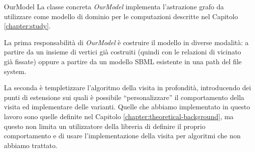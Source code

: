 \begin{paragraph}{OurModel}
  La classe concreta \emph{OurModel} implementa l'astrazione grafo da
  utilizzare come modello di dominio per le computazioni descritte nel
  Capitolo \ref{chapter:study}.

  La prima responsabilit\`a di \emph{OurModel} \`e costruire il
  modello in diverse modalit\`a: a partire da un insieme di vertici
  gi\`a costruiti (quindi con le relazioni di vicinato gi\`a fissate)
  oppure a partire da un modello SBML esistente in una path del file
  system.

  La seconda \`e templetizzare l'algoritmo della visita in
  profondit\`a, introducendo dei punti di estensione sui quali \`e
  possibile ``personalizzare'' il comportamento della visita ed
  implementare delle varianti. Quelle che abbiamo implementato in
  questo lavoro sono quelle definite nel Capitolo
  \ref{chapter:theoretical-background}, ma questo non limita un
  utilizzatore della libreria di definire il proprio comportamento e
  di usare l'implementazione della visita per algoritmi che non
  abbiamo trattato.

\end{paragraph}

